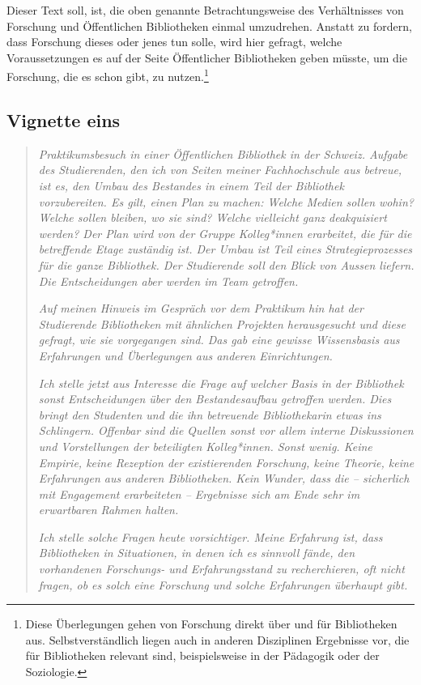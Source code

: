 \documentclass[a4paper,
fontsize=11pt,
oneside,
numbers=noperiodatend,
parskip=half-,
bibliography=totoc,
final
]{scrartcl}
\begin{document}
Dieser Text soll, ist, die oben genannte Betrachtungsweise des
Verhältnisses von Forschung und Öffentlichen Bibliotheken einmal
umzudrehen. Anstatt zu fordern, dass Forschung dieses oder jenes tun
solle, wird hier gefragt, welche Voraussetzungen es auf der Seite
Öffentlicher Bibliotheken geben müsste, um die Forschung, die es schon
gibt, zu nutzen.\footnote{Diese Überlegungen gehen von Forschung direkt
  über und für Bibliotheken aus. Selbstverständlich liegen auch in
  anderen Disziplinen Ergebnisse vor, die für Bibliotheken relevant
  sind, beispielsweise in der Pädagogik oder der Soziologie.}

\hypertarget{vignette-eins}{%
\subsection{Vignette eins}\label{vignette-eins}}

\begin{quote}
\emph{Praktikumsbesuch in einer Öffentlichen Bibliothek in der Schweiz.
Aufgabe des Studierenden, den ich von Seiten meiner Fachhochschule aus
betreue, ist es, den Umbau des Bestandes in einem Teil der Bibliothek
vorzubereiten. Es gilt, einen Plan zu machen: Welche Medien sollen
wohin? Welche sollen bleiben, wo sie sind? Welche vielleicht ganz
deakquisiert werden? Der Plan wird von der Gruppe Kolleg*innen
erarbeitet, die für die betreffende Etage zuständig ist. Der Umbau ist
Teil eines Strategieprozesses für die ganze Bibliothek. Der Studierende
soll den Blick von Aussen liefern. Die Entscheidungen aber werden im
Team getroffen.}

\emph{Auf meinen Hinweis im Gespräch vor dem Praktikum hin hat der
Studierende Bibliotheken mit ähnlichen Projekten herausgesucht und diese
gefragt, wie sie vorgegangen sind. Das gab eine gewisse Wissensbasis aus
Erfahrungen und Überlegungen aus anderen Einrichtungen.}

\emph{Ich stelle jetzt aus Interesse die Frage auf welcher Basis in der
Bibliothek sonst Entscheidungen über den Bestandesaufbau getroffen
werden. Dies bringt den Studenten und die ihn betreuende Bibliothekarin
etwas ins Schlingern. Offenbar sind die Quellen sonst vor allem interne
Diskussionen und Vorstellungen der beteiligten Kolleg*innen. Sonst
wenig. Keine Empirie, keine Rezeption der existierenden Forschung, keine
Theorie, keine Erfahrungen aus anderen Bibliotheken. Kein Wunder, dass
die -- sicherlich mit Engagement erarbeiteten -- Ergebnisse sich am Ende
sehr im erwartbaren Rahmen halten.}

\emph{Ich stelle solche Fragen heute vorsichtiger. Meine Erfahrung ist,
dass Bibliotheken in Situationen, in denen ich es sinnvoll fände, den
vorhandenen Forschungs- und Erfahrungsstand zu recherchieren, oft nicht
fragen, ob es solch eine Forschung und solche Erfahrungen überhaupt
gibt.}
\end{quote}
\end{document}
